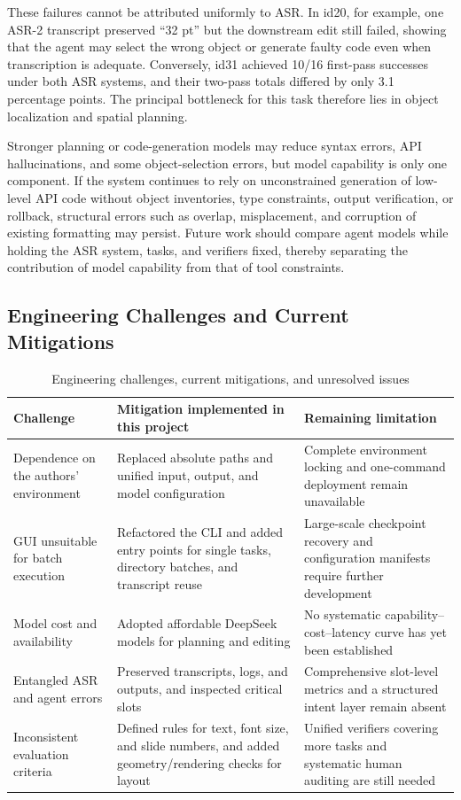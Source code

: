 \documentclass[11pt,a4paper,UTF8,fontset=fandol]{ctexart}
\begin{document}
These failures cannot be attributed uniformly to ASR. In id20, for example, one ASR-2 transcript preserved ``32 pt'' but the downstream edit still failed, showing that the agent may select the wrong object or generate faulty code even when transcription is adequate. Conversely, id31 achieved 10/16 first-pass successes under both ASR systems, and their two-pass totals differed by only 3.1 percentage points. The principal bottleneck for this task therefore lies in object localization and spatial planning.

Stronger planning or code-generation models may reduce syntax errors, API hallucinations, and some object-selection errors, but model capability is only one component. If the system continues to rely on unconstrained generation of low-level API code without object inventories, type constraints, output verification, or rollback, structural errors such as overlap, misplacement, and corruption of existing formatting may persist. Future work should compare agent models while holding the ASR system, tasks, and verifiers fixed, thereby separating the contribution of model capability from that of tool constraints.

\subsection{Engineering Challenges and Current Mitigations}

\begin{table}[H]
\centering
\caption{Engineering challenges, current mitigations, and unresolved issues}
\small
\begin{tabularx}{\textwidth}{L{3.0cm} Y Y}
\toprule
Challenge & Mitigation implemented in this project & Remaining limitation \\
\midrule
Dependence on the authors' environment & Replaced absolute paths and unified input, output, and model configuration & Complete environment locking and one-command deployment remain unavailable \\
GUI unsuitable for batch execution & Refactored the CLI and added entry points for single tasks, directory batches, and transcript reuse & Large-scale checkpoint recovery and configuration manifests require further development \\
Model cost and availability & Adopted affordable DeepSeek models for planning and editing & No systematic capability--cost--latency curve has yet been established \\
Entangled ASR and agent errors & Preserved transcripts, logs, and outputs, and inspected critical slots & Comprehensive slot-level metrics and a structured intent layer remain absent \\
Inconsistent evaluation criteria & Defined rules for text, font size, and slide numbers, and added geometry/rendering checks for layout & Unified verifiers covering more tasks and systematic human auditing are still needed \\
\bottomrule
\end{tabularx}
\end{table}
\end{document}
